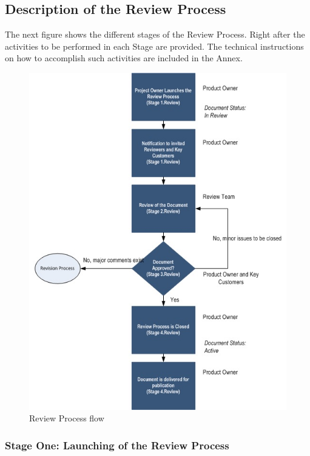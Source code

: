 \documentclass{template/openetcs_article}
\begin{document}
\subsection{Description of the Review Process}

The next figure shows the different stages of the Review Process. Right after the activities to be performed in each Stage are provided. The technical instructions on how to accomplish such activities are included in the Annex.

\begin{figure}[H]
\centering
\includegraphics{./figures/Review_Process.JPG}
\caption{Review Process flow}
\end{figure}


\subsubsection{Stage One: Launching of the Review Process}
\end{document}
